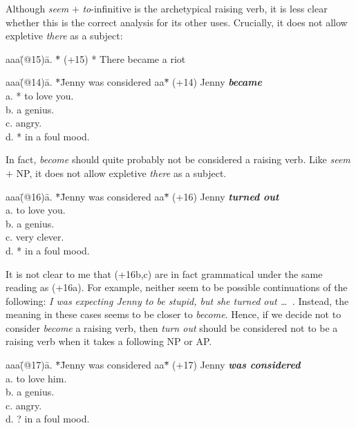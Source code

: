 Although {\em seem\/} $+$ {\em to\/}-infinitive is the archetypical raising verb, 
it is less clear whether this is the correct analysis for its other uses.   
Crucially, it does not allow expletive {\em there\/} as a
subject:
\begin{tabbing}
aaa\=(@15)\= a. \= *\= \kill
   \>(+15)\>    \> *\> There became a riot 
\end{tabbing}
\begin{tabbing}
aaa\=(@14)\= a. \= *\= Jenny was considered aa\= *\=        \kill
   \>(+14)\>    \>  \> Jenny {\em \bf became\/}       \\
   \>     \> a. \>  \>                  \> *\> to love you. \\
   \>     \> b. \>  \>                  \>  \> a genius.    \\    
   \>     \> c. \>  \>                  \>  \> angry.    \\    
   \>     \> d. \>  \>                  \> *\> in a foul mood.
\end{tabbing}
In fact, {\em become} should quite probably not be considered a
raising verb. Like {\em seem\/} $+$ NP, it does not allow expletive {\em there\/} 
as a subject.
\begin{tabbing}
aaa\=(@16)\= a. \= *\= Jenny was considered aa\= *\=        \kill
   \>(+16)\>    \>  \> Jenny {\em \bf turned out}                \\
   \>     \> a. \>  \>                  \>  \> to love you. \\
   \>     \> b. \>  \>                  \>  \> a genius.    \\    
   \>     \> c. \>  \>                  \>  \> very clever.    \\    
   \>     \> d. \>  \>                  \> *\> in a foul mood.
\end{tabbing}
It is not clear to me that (+16b,c) are in fact grammatical under
the same reading as (+16a). For example, neither
seem to be possible continuations of the following: {\em I was
expecting Jenny to be stupid, but she turned out \ldots\ .} Instead, the
meaning in these cases seems to be closer to {\em become\/}. Hence, if
we decide not to consider {\em become} a raising verb, then 
{\em turn out\/} should be considered not to be a raising verb when it
takes a following NP or AP.
\begin{tabbing}
aaa\=(@17)\= a. \= *\= Jenny was considered aa\= *\=        \kill
   \>(+17)\>    \>  \> Jenny {\em \bf was considered}                \\
   \>     \> a. \>  \>                  \>  \> to love him. \\
   \>     \> b. \>  \>                  \>  \> a genius.    \\    
   \>     \> c. \>  \>                  \>  \> angry.    \\    
   \>     \> d. \>  \>                  \> ?\> in a foul mood.
\end{tabbing}
